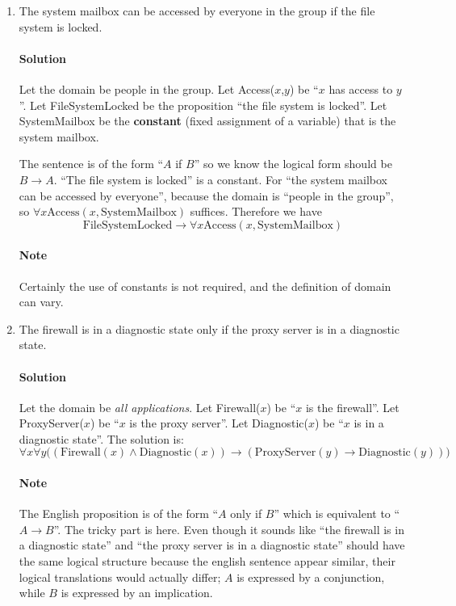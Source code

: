 \documentclass[10pt]{article}
\newcommand{\mapto}{\rightarrow}
\begin{document}
\begin{enumerate}[label=(\alph*)]
\item The system mailbox can be accessed by everyone in the group if the file system is locked.
  \paragraph{Solution} Let the domain be people in the group. Let Access($x$,$y$) be ``$x$ has access to $y$''. Let FileSystemLocked be the proposition ``the file system is locked''. Let SystemMailbox be the \textbf{constant} (fixed assignment of a variable) that is the system mailbox.

  The sentence is of the form ``$A$ if $B$'' so we know the logical form should be $B\mapto A$. ``The file system is locked'' is a constant. For ``the system mailbox can be accessed by everyone'', because the domain is ``people in the group'', so $\forall x\text{Access}(x, \text{SystemMailbox})$ suffices. Therefore we have
  \begin{equation}
    \text{FileSystemLocked}\mapto \forall x\text{Access}(x, \text{SystemMailbox})
  \end{equation}
  \paragraph{Note} Certainly the use of constants is not required, and the definition of domain can vary.

\item The firewall is in a diagnostic state only if the proxy server is in a diagnostic state.

  \paragraph{Solution} Let the domain be \emph{all applications}. Let Firewall($x$) be ``$x$ is the firewall''. Let ProxyServer($x$) be ``$x$ is the proxy server''. Let Diagnostic($x$) be ``$x$ is in a diagnostic state''. The solution is:
  \begin{equation}
    \forall x\forall y\Big((\text{Firewall}(x)\land\text{Diagnostic}(x))\mapto(\text{ProxyServer}(y)\mapto\text{Diagnostic}(y))\Big)
  \end{equation}

\paragraph{Note} The English proposition is of the form ``$A$ only if $B$'' which is equivalent to ``$A\mapto B$''. The tricky part is here. Even though it sounds like ``the firewall is in a diagnostic state'' and ``the proxy server is in a diagnostic state'' should have the same logical structure because the english sentence appear similar, their logical translations would actually differ; $A$ is expressed by a conjunction, while $B$ is expressed by an implication.


\end{enumerate}
\end{document}
